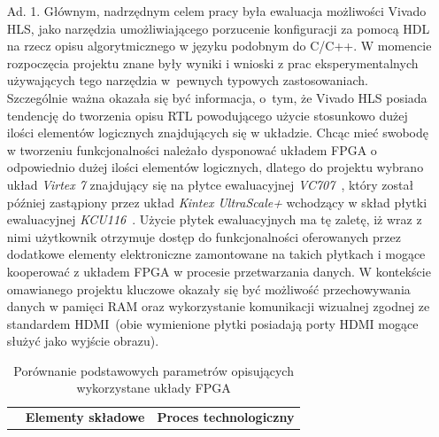 \begin{enumerate}
\item[Ad. 1.] Głównym, nadrzędnym celem pracy była ewaluacja możliwości Vivado HLS, jako narzędzia umożliwiającego porzucenie konfiguracji za pomocą HDL na rzecz opisu algorytmicznego w języku podobnym do C/C++. W momencie rozpoczęcia projektu znane były wyniki i wnioski z prac eksperymentalnych używających tego narzędzia w~pewnych typowych zastosowaniach. Szczególnie ważna okazała się być informacja, o~tym, że Vivado HLS posiada tendencję do tworzenia opisu RTL powodującego użycie stosunkowo dużej ilości elementów logicznych znajdujących się w układzie. Chcąc mieć swobodę w tworzeniu funkcjonalności należało dysponować układem FPGA o odpowiednio dużej ilości elementów logicznych, dlatego do projektu wybrano układ \textit{Virtex 7} znajdujący się na płytce ewaluacyjnej \textit{VC707}~\cite{VC707_UG}, który został później zastąpiony przez układ \textit{Kintex UltraScale+} wchodzący w skład płytki ewaluacyjnej \textit{KCU116}~\cite{KCU116_UG}. 
Użycie płytek ewaluacyjnych ma tę zaletę, iż wraz z nimi użytkownik otrzymuje dostęp do funkcjonalności oferowanych przez dodatkowe elementy elektroniczne zamontowane na takich płytkach i mogące kooperować z układem FPGA w procesie przetwarzania danych. W kontekście omawianego projektu kluczowe okazały się być możliwość przechowywania danych w pamięci RAM oraz wykorzystanie komunikacji wizualnej zgodnej ze standardem HDMI~(obie wymienione płytki posiadają porty HDMI mogące służyć jako wyjście obrazu).
\begin{savenotes}
\begin{table}[H]
\centering
\caption{Porównanie podstawowych parametrów opisujących wykorzystane układy FPGA}
\label{ch3:tab:fpga_comp}
\begin{tabular}{|r|c|c|c|c|c|}
\hline
\multirow{2}{*}{} & \multicolumn{4}{c|}{\textbf{Elementy składowe}} & \multirow{2}{*}{\textbf{Proces technologiczny}} \\ \cline{2-5}

\end{tabular}
\end{table}
\end{savenotes}
\end{enumerate}
